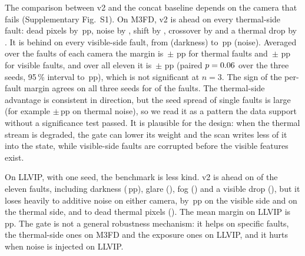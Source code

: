 The comparison between v2 and the concat baseline depends on the camera that fails (Supplementary Fig.~S1). On M3FD, v2 is ahead on every thermal-side fault: dead pixels by \fltMfdMarginThermalDeadSevThreeMeanMap{}\,pp, noise by \fltMfdMarginThermalNoiseSevThreeMeanMap{}, shift by \fltMfdMarginThermalShiftSevThreeMeanMap{}, crossover by \fltMfdMarginThermalCrossoverSevThreeMeanMap{} and a thermal drop by \fltMfdMarginThermalDropSevThreeMeanMap{}. It is behind on every visible-side fault, from \fltMfdMarginVisibleDarkSevThreeMeanMap{} (darkness) to \fltMfdMarginVisibleNoiseSevThreeMeanMap{}\,pp (noise). Averaged over the faults of each camera the margin is \fltMfdMarginMeanThermalAvgSevThreeMap{}\,$\pm$\,\fltMfdMarginStdThermalAvgSevThreeMap{}\,pp for thermal faults and \fltMfdMarginMeanVisibleAvgSevThreeMap{}\,$\pm$\,\fltMfdMarginStdVisibleAvgSevThreeMap{}\,pp for visible faults, and over all eleven it is \fltMfdMarginMeanAvgSevThreeMap{}\,$\pm$\,\fltMfdMarginStdAvgSevThreeMap{}\,pp (paired $p=0.06{}$ over the three seeds, 95\,\% interval \fltMfdMarginAvgCiLow{} to \fltMfdMarginAvgCiHigh{}\,pp), which is not significant at $n=3$. The sign of the per-fault margin agrees on all three seeds for \fltMfdSignAgreeSevThree{} of the \fltMfdFaultCount{} faults. The thermal-side advantage is consistent in direction, but the seed spread of single faults is large (for example $\pm$\fltMfdMarginThermalNoiseSevThreeStdMap{}\,pp on thermal noise), so we read it as a pattern the data support without a significance test passed. It is plausible for the design: when the thermal stream is degraded, the gate can lower its weight and the scan writes less of it into the state, while visible-side faults are corrupted before the visible features exist.

On LLVIP, with one seed, the benchmark is less kind. v2 is ahead on \fltLlvipWinsSevThree{} of the eleven faults, including darkness (\fltLlvipMarginVisibleDarkSevThreeMap{}\,pp), glare (\fltLlvipMarginVisibleGlareSevThreeMap{}), fog (\fltLlvipMarginVisibleFogSevThreeMap{}) and a visible drop (\fltLlvipMarginVisibleDropSevThreeMap{}), but it loses heavily to additive noise on either camera, by \fltLlvipMarginVisibleNoiseSevThreeMap{}\,pp on the visible side and \fltLlvipMarginThermalNoiseSevThreeMap{} on the thermal side, and to dead thermal pixels (\fltLlvipMarginThermalDeadSevThreeMap{}). The mean margin on LLVIP is \fltLlvipMarginAvgSevThreeMap{}\,pp. The gate is not a general robustness mechanism: it helps on specific faults, the thermal-side ones on M3FD and the exposure ones on LLVIP, and it hurts when noise is injected on LLVIP.

